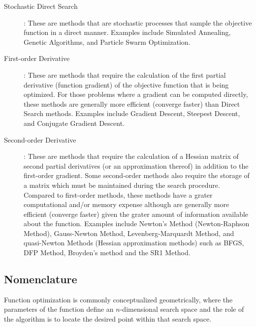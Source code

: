 \begin{bibunit}
\begin{description}
	\item[Stochastic Direct Search]: These are methods that are stochastic processes that sample the objective function in a direct manner. Examples include Simulated Annealing, Genetic Algorithms, and Particle Swarm Optimization.

	\item[First-order Derivative]: These are methods that require the calculation of the first partial derivative (function gradient) of the objective function that is being optimized. For those problems where a gradient can be computed directly, these methods are generally more efficient (converge faster) than Direct Search methods. Examples include Gradient Descent, Steepest Descent, and Conjugate Gradient Descent.

	\item[Second-order Derivative]: These are methods that require the calculation of a Hessian matrix of second partial derivatives (or an approximation thereof) in addition to the first-order gradient. Some second-order methods also require the storage of a matrix which must be maintained during the search procedure. Compared to first-order methods, these methods have a grater computational and/or memory expense although are generally more efficient (converge faster) given the grater amount of information available about the function. Examples include Newton's Method (Newton-Raphson Method), Gauss-Newton Method, Levenberg-Marquardt Method, and quasi-Newton Methods (Hessian approximation methods) such as BFGS, DFP Method, Broyden's method and the SR1 Method.
\end{description}

\subsection{Nomenclature}
Function optimization is commonly conceptualized geometrically, where the parameters of the function define an $n$-dimensional search space and the role of the algorithm is to locate the desired point within that search space.


\end{bibunit}
